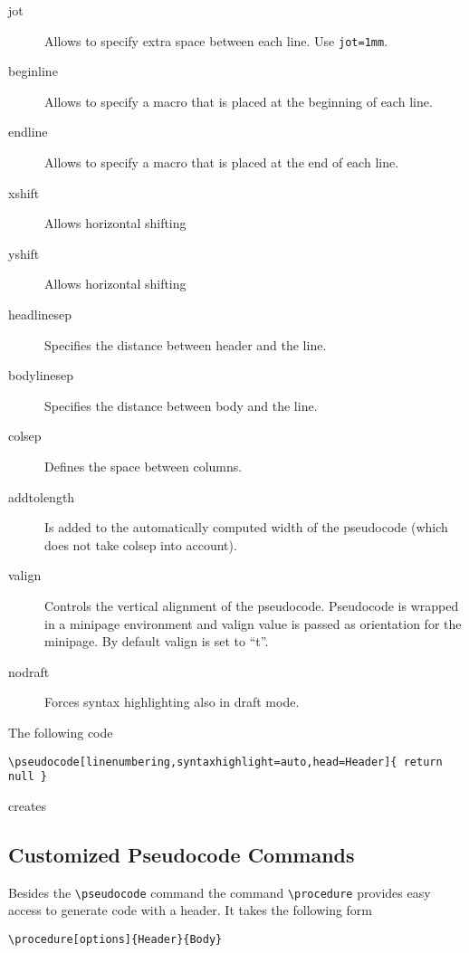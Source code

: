 \documentclass[a4paper]{report}
\begin{document}
\begin{description}
\item[jot]
Allows to specify extra space between each line. Use \lstinline$jot=1mm$.

\item[beginline]
Allows to specify a macro that is placed at the beginning of each line.

\item[endline]
Allows to specify a macro that is placed at the end of each line.

\item[xshift]
Allows horizontal shifting
\item[yshift]
Allows horizontal shifting

\item[headlinesep]
Specifies the distance between header and the line.
\item[bodylinesep]
Specifies the distance between body and the line.
\item[colsep]
Defines the space between columns.
\item[addtolength]
Is added to the automatically computed width of the pseudocode (which does not take colsep into account). 

\item[valign]
Controls the vertical alignment of the pseudocode. Pseudocode is wrapped in a minipage environment and valign value is passed as orientation for the minipage. By default valign is set to \enquote{t}.

\item[nodraft]
Forces syntax highlighting also in draft mode.
\end{description}
The following code 
\begin{lstlisting}
\pseudocode[linenumbering,syntaxhighlight=auto,head=Header]{ return null }
\end{lstlisting}
creates 
\begin{center}
\end{center}

\subsection{Customized Pseudocode Commands}

Besides the  \lstinline{\pseudocode}  command the command  \lstinline{\procedure}
provides easy access to generate code with a header. It takes the following form
\begin{lstlisting}
\procedure[options]{Header}{Body}
\end{lstlisting}
\end{document}
